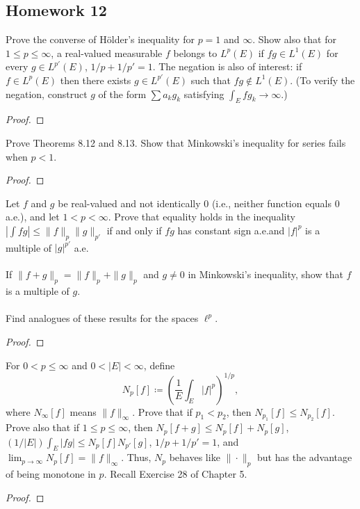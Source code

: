 \subsection{Homework 12}
\begin{problem}
Prove the converse of Hölder's inequality for $p=1$ and $\infty$. Show also
that for $1\leq p\leq\infty$, a real-valued measurable $f$ belongs to
$L^p(E)$ if $fg\in L^1(E)$ for every $g\in L^{p'}(E)$, $1/p+1/p'=1$. The
negation is also of interest: if $f\in L^p(E)$ then there exists $g\in
L^{p'}(E)$ such that $fg\notin L^1(E)$. (To verify the negation, construct
$g$ of the form $\sum a_kg_k$ satisfying $\int_E fg_k\to\infty$.)
\end{problem}
\begin{proof}
\end{proof}

\begin{problem}
Prove Theorems 8.12 and 8.13. Show that Minkowski’s inequality for series
fails when $p<1$.
\end{problem}
\begin{proof}
\end{proof}

\begin{problem}
Let $f$ and $g$ be real-valued and not identically $0$ (i.e., neither
function equals $0$ a.e.), and let $1<p<\infty$. Prove that equality holds
in the inequality $|\int fg|\leq\|f\|_p\|g\|_{p'}$ if and only if
$fg$ has constant sign a.e.\@ and $|f|^p$ is a multiple of $|g|^{p'}$ a.e.
\\\\
If $\|f+g\|_p=\|f\|_p+\|g\|_{p}$ and $g\neq 0$ in Minkowski's inequality,
show that $f$ is a multiple of $g$.
\\\\
Find analogues of these results for the spaces $\ell^p$.
\end{problem}
\begin{proof}
\end{proof}

\begin{problem}
For $0<p\leq\infty$ and $0<|E|<\infty$, define
\[
N_p[f]\coloneqq\left(\frac{1}{E}\int_E|f|^p\right)^{1/p},
\]
where $N_\infty[f]$ means $\|f\|_\infty$. Prove that if $p_1<p_2$, then
$N_{p_1}[f]\leq N_{p_2}[f]$. Prove also that if $1\leq p\leq \infty$, then
$N_p[f+g]\leq N_p[f]+N_p[g]$, $(1/|E|)\int_E|fg|\leq N_p[f]N_{p'}[g]$,
$1/p+1/p'=1$, and $\lim_{p\to\infty} N_p[f]=\|f\|_\infty$. Thus, $N_p$
behaves like $\|\cdot\|_p$ but has the advantage of being monotone in
$p$. Recall Exercise 28 of Chapter 5.
\end{problem}
\begin{proof}
\end{proof}

